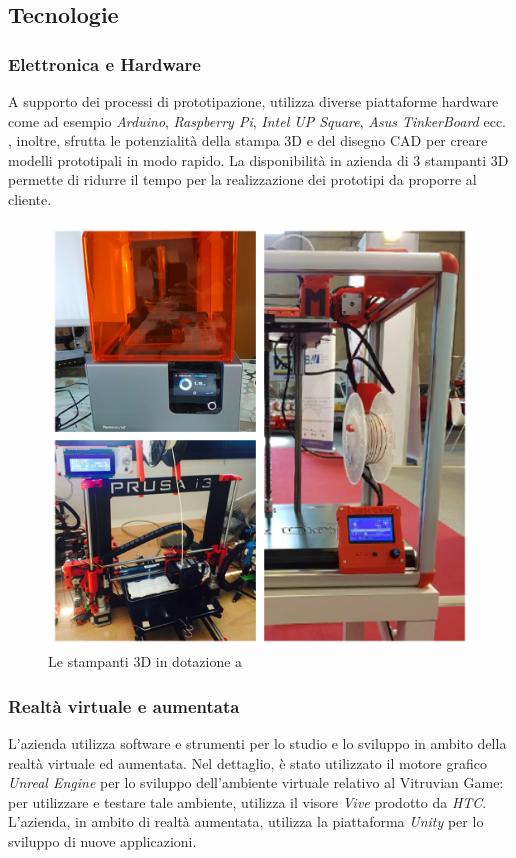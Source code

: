 \subsection{Tecnologie}

\subsubsection{Elettronica e Hardware}
A supporto dei processi di prototipazione, \lab{} utilizza diverse piattaforme hardware come ad esempio \textit{Arduino}, \textit{Raspberry Pi}, \textit{Intel UP Square}, \textit{Asus TinkerBoard} ecc.\\
\lab{}, inoltre, sfrutta le potenzialità della stampa 3D e del disegno CAD per creare modelli prototipali in modo rapido. La disponibilità in azienda di 3 stampanti 3D permette di ridurre il tempo per la realizzazione dei prototipi da proporre al cliente.

\begin{figure}[H]
	\begin{center}
	\includegraphics[scale=0.07]{immagini/stampanti.jpg}
	\caption{Le stampanti 3D in dotazione a \lab{}}
	\end{center}
\end{figure}

\subsubsection{Realtà virtuale e aumentata}
L'azienda utilizza software e strumenti per lo studio e lo sviluppo in ambito della realtà virtuale ed aumentata.
Nel dettaglio, è stato utilizzato il motore grafico \textit{Unreal Engine} per lo sviluppo dell'ambiente virtuale relativo al Vitruvian Game: per utilizzare e testare tale ambiente, \lab{} utilizza il visore \textit{Vive} prodotto da \textit{HTC}.\\
L'azienda, in ambito di realtà aumentata, utilizza la piattaforma \textit{Unity} per lo sviluppo di nuove applicazioni.\\

